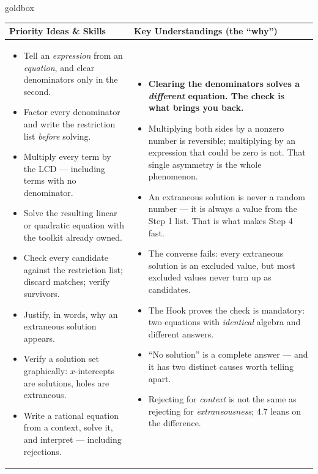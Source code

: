 \documentclass[10pt]{article}
\begin{document}
\renewcommand{\arraystretch}{1.4}
\begin{skillbox}{goldbox}
\begin{tabularx}{\linewidth}{@{}X|X@{}}
\textbf{Priority Ideas \& Skills} & \textbf{Key Understandings (the ``why'')} \\[2pt]
\hline
\vspace{-6pt}
\begin{itemize}[leftmargin=1.1em, nosep, after=\vspace{2pt}]
  \item Tell an \emph{expression} from an \emph{equation}, and clear denominators only in the second.
  \item Factor every denominator and write the restriction list \emph{before} solving.
  \item Multiply every term by the LCD --- including terms with no denominator.
  \item Solve the resulting linear or quadratic equation with the toolkit already owned.
  \item Check every candidate against the restriction list; discard matches; verify survivors.
  \item Justify, in words, why an extraneous solution appears.
  \item Verify a solution set graphically: $x$-intercepts are solutions, holes are extraneous.
  \item Write a rational equation from a context, solve it, and interpret --- including rejections.
\end{itemize}
&
\vspace{-6pt}
\begin{itemize}[leftmargin=1.1em, nosep, after=\vspace{2pt}]
  \item \textbf{Clearing the denominators solves a \emph{different} equation. The check is what brings you back.}
  \item Multiplying both sides by a nonzero number is reversible; multiplying by an expression that could be zero is not. That single asymmetry is the whole phenomenon.
  \item An extraneous solution is never a random number --- it is always a value from the Step 1 list. That is what makes Step 4 fast.
  \item The converse fails: every extraneous solution is an excluded value, but most excluded values never turn up as candidates.
  \item The Hook proves the check is mandatory: two equations with \emph{identical} algebra and different answers.
  \item ``No solution'' is a complete answer --- and it has two distinct causes worth telling apart.
  \item Rejecting for \emph{context} is not the same as rejecting for \emph{extraneousness}; 4.7 leans on the difference.
\end{itemize}
\end{tabularx}
\end{skillbox}
\end{document}
